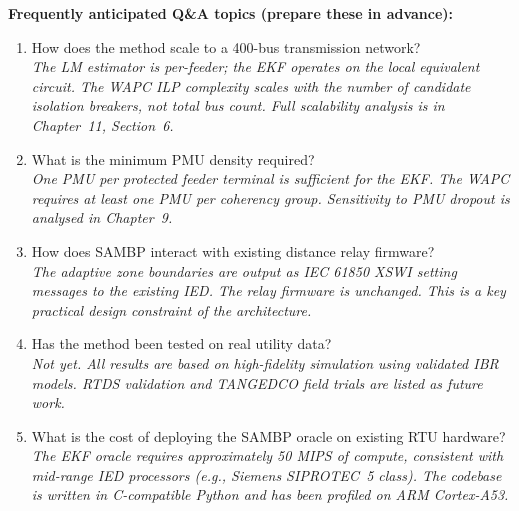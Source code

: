 \documentclass[11pt,a4paper]{article}
\begin{document}
\bigskip
\begin{mdframed}[backgroundcolor=notesbg, linecolor=iitmnavy, linewidth=1pt,
  innertopmargin=8pt, innerbottommargin=8pt, innerleftmargin=10pt]
\textbf{Frequently anticipated Q\&A topics (prepare these in advance):}
\begin{enumerate}[leftmargin=1.5em, itemsep=4pt]
  \item How does the method scale to a 400-bus transmission network? \\
        \textit{The LM estimator is per-feeder; the EKF operates on the local
        equivalent circuit. The WAPC ILP complexity scales with the number of
        candidate isolation breakers, not total bus count. Full scalability analysis
        is in Chapter~11, Section~6.}
  \item What is the minimum PMU density required? \\
        \textit{One PMU per protected feeder terminal is sufficient for the EKF.
        The WAPC requires at least one PMU per coherency group. Sensitivity to
        PMU dropout is analysed in Chapter~9.}
  \item How does SAMBP interact with existing distance relay firmware? \\
        \textit{The adaptive zone boundaries are output as IEC 61850 XSWI setting
        messages to the existing IED. The relay firmware is unchanged. This is a
        key practical design constraint of the architecture.}
  \item Has the method been tested on real utility data? \\
        \textit{Not yet. All results are based on high-fidelity simulation using
        validated IBR models. RTDS validation and TANGEDCO field trials are
        listed as future work.}
  \item What is the cost of deploying the SAMBP oracle on existing RTU hardware? \\
        \textit{The EKF oracle requires approximately 50 MIPS of compute, consistent
        with mid-range IED processors (e.g., Siemens SIPROTEC~5 class). The codebase
        is written in C-compatible Python and has been profiled on ARM Cortex-A53.}
\end{enumerate}
\end{mdframed}
\end{document}

